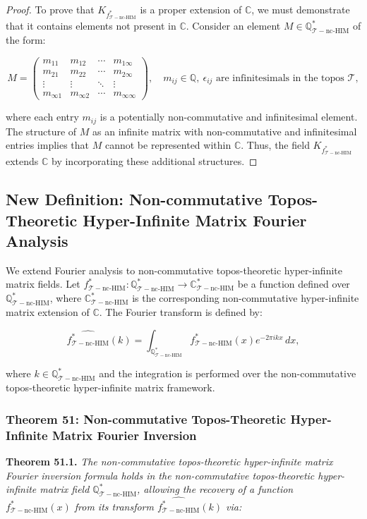 \documentclass{article}
\begin{document}
\begin{proof}
To prove that \(K_{f_{\mathcal{T}-\text{nc-HIM}}^*}\) is a proper extension of \(\mathbb{C}\), we must demonstrate that it contains elements not present in \(\mathbb{C}\). Consider an element \(M \in \mathbb{Q}_{\mathcal{T}-\text{nc-HIM}}^*\) of the form:

\[
M = \begin{pmatrix}
m_{11} & m_{12} & \cdots & m_{1\infty} \\
m_{21} & m_{22} & \cdots & m_{2\infty} \\
\vdots & \vdots & \ddots & \vdots \\
m_{\infty 1} & m_{\infty 2} & \cdots & m_{\infty \infty}
\end{pmatrix}, \quad m_{ij} \in \mathbb{Q}, \ \epsilon_{ij} \text{ are infinitesimals in the topos } \mathcal{T},
\]

where each entry \(m_{ij}\) is a potentially non-commutative and infinitesimal element. The structure of \(M\) as an infinite matrix with non-commutative and infinitesimal entries implies that \(M\) cannot be represented within \(\mathbb{C}\). Thus, the field \(K_{f_{\mathcal{T}-\text{nc-HIM}}^*}\) extends \(\mathbb{C}\) by incorporating these additional structures.
\end{proof}

\subsection{New Definition: Non-commutative Topos-Theoretic Hyper-Infinite Matrix Fourier Analysis}
We extend Fourier analysis to non-commutative topos-theoretic hyper-infinite matrix fields. Let \(f_{\mathcal{T}-\text{nc-HIM}}^*: \mathbb{Q}_{\mathcal{T}-\text{nc-HIM}}^* \to \mathbb{C}_{\mathcal{T}-\text{nc-HIM}}^*\) be a function defined over \(\mathbb{Q}_{\mathcal{T}-\text{nc-HIM}}^*\), where \(\mathbb{C}_{\mathcal{T}-\text{nc-HIM}}^*\) is the corresponding non-commutative hyper-infinite matrix extension of \(\mathbb{C}\). The Fourier transform is defined by:

\[
\widehat{f_{\mathcal{T}-\text{nc-HIM}}^*}(k) = \int_{\mathbb{Q}_{\mathcal{T}-\text{nc-HIM}}^*} f_{\mathcal{T}-\text{nc-HIM}}^*(x) e^{-2\pi i k x} \, dx,
\]

where \(k \in \mathbb{Q}_{\mathcal{T}-\text{nc-HIM}}^*\) and the integration is performed over the non-commutative topos-theoretic hyper-infinite matrix framework.

\subsubsection{Theorem 51: Non-commutative Topos-Theoretic Hyper-Infinite Matrix Fourier Inversion}
\textbf{Theorem 51.1.} \textit{The non-commutative topos-theoretic hyper-infinite matrix Fourier inversion formula holds in the non-commutative topos-theoretic hyper-infinite matrix field \(\mathbb{Q}_{\mathcal{T}-\text{nc-HIM}}^*\), allowing the recovery of a function \(f_{\mathcal{T}-\text{nc-HIM}}^*(x)\) from its transform \(\widehat{f_{\mathcal{T}-\text{nc-HIM}}^*}(k)\) via:}
\end{document}
